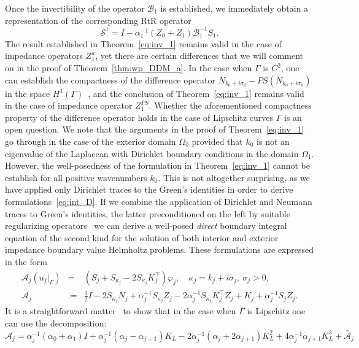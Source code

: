 \documentclass[11pt]{article}
\numberwithin{equation}{section}
\begin{document}
Once the invertibility of the operator $\mathcal{B}_1$ is established, we immediately obtain a representation of the corresponding RtR operator
\begin{equation}\label{eq:S1_B1}
  \mathcal{S}^1=I-\alpha_1^{-1}(Z_0+Z_1)\mathcal{B}_1^{-1}S_1.
  \end{equation}
The result established in Theorem~\ref{eq:inv_1} remains valid in the case of impedance operators $Z_1^a$, yet there are certain differences that we will comment on in the proof of Theorem~\ref{thm:wp_DDM_a}. In the case when $\Gamma$ is $C^2$, one can establish the compactness of the difference operator $N_{k_0+i\sigma_0}-PS(N_{k_0+i\sigma_0})$ in the space $H^1(\Gamma)$~\cite{turc2}, and the conclusion of Theorem~\ref{eq:inv_1} remains valid in the case of impedance operator $Z_1^{PS}$. Whether the aforementioned compactness property of the difference operator holds in the case of Lipschitz curves $\Gamma$ is an open question. We note that the arguments in the proof of Theorem~\ref{eq:inv_1} go through in the case of the exterior domain $\Omega_0$ provided that $k_0$ is not an eigenvalue of the Laplacean with Dirichlet boundary conditions in the domain $\Omega_1$. However, the well-posedness of the formulation in Theorem~\ref{eq:inv_1} cannot be establish for all positive wavenumbers $k_0$. This is not altogether surprising, as we have applied only Dirichlet traces to the Green's identities in order to derive formulations~\eqref{eq:int_D}. If we combine the application of Dirichlet and Neumann traces to Green's identities, the latter preconditioned on the left by suitable regularizing operators~\cite{turc2016well} we can derive a well-posed {\em direct} boundary integral equation of the second kind for the solution of both interior and exterior impedance boundary value Helmholtz problems. These formulations are expressed in the form
\begin{eqnarray}\label{eq:CFIER2}
\mathcal{A}_{j}(u_j|_\Gamma)&=&(S_j+S_{\kappa_j}-2S_{\kappa_j} K_j^\top)\varphi_j,\quad \kappa_j=k_j+i\sigma_j,\ \sigma_j>0,\nonumber\\
\mathcal{A}_{j}&:=&\frac{1}{2}I-2S_{\kappa_j} N_j+ \alpha_j^{-1}S_{\kappa_j}Z_j-2 \alpha_j^{-1}S_{\kappa_j} K_j^\top Z_j +K_j+\alpha_j^{-1}S_jZ_j. 
\end{eqnarray}
It is a straightforward matter~\cite{turc2016well} to show that in the case when $\Gamma$ is Lipschitz one can use the decomposition:
\begin{equation}\label{eq:A_comp}
  \mathcal{A}_j=\alpha_j^{-1}(\alpha_0+\alpha_1)I+\alpha_j^{-1}(\alpha_j-\alpha_{j+1})K_L-2\alpha_j^{-1}(\alpha_j+2\alpha_{j+1})K_L^2+4\alpha_j^{-1}\alpha_{j+1}K_L^3+\widetilde{\mathcal{A}_j}
\end{equation}
\end{document}
